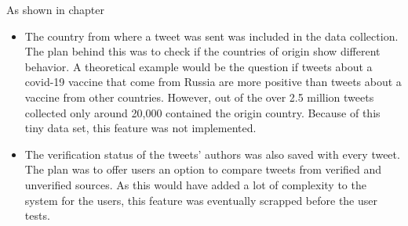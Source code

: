 As shown in chapter 

\begin{itemize}
  
    \item The country from where a tweet was sent was included in the data collection. The plan behind this was to check if the countries of origin show different behavior. A theoretical example would be the question if tweets about a covid-19 vaccine that come from Russia are more positive than tweets about a vaccine from other countries. However, out of the over 2.5 million tweets collected only around 20,000 contained the origin country. Because of this tiny data set, this feature was not implemented.
    \item The verification status of the tweets' authors was also saved with every tweet. The plan was to offer users an option to compare tweets from verified and unverified sources. As this would have added a lot of complexity to the system for the users, this feature was eventually scrapped before the user tests.
\end{itemize}


